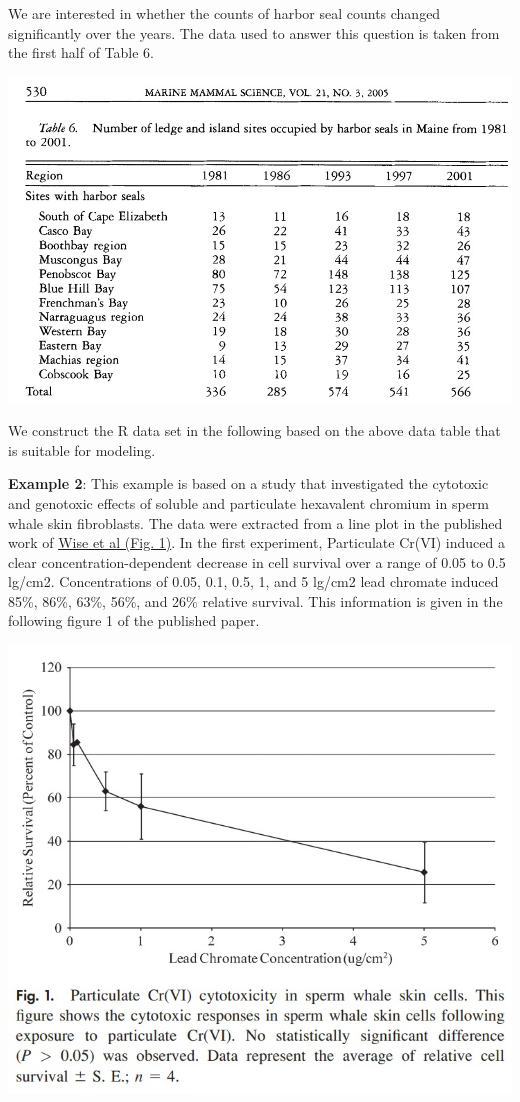 \documentclass[
]{book}
\begin{document}
We are interested in whether the counts of harbor seal counts changed significantly over the years. The data used to answer this question is taken from the first half of Table 6.

\begin{center}\includegraphics[width=0.8\linewidth]{img13/w13-HarborSealDataTable} \end{center}

We construct the R data set in the following based on the above data table that is suitable for modeling.

\textbf{Example 2}: This example is based on a study that investigated the cytotoxic and genotoxic effects of soluble and particulate hexavalent chromium in sperm whale skin fibroblasts. The data were extracted from a line plot in the published work of \href{https://stat501.s3.amazonaws.com/w13-TheGenotoxicityofParticulate+andSolubleChromate.pdf}{Wise et al (Fig. 1)}. In the first experiment, Particulate Cr(VI) induced a clear concentration-dependent decrease in cell survival over a range of 0.05 to 0.5 lg/cm2. Concentrations of 0.05, 0.1, 0.5, 1, and 5 lg/cm2 lead chromate induced 85\%, 86\%, 63\%, 56\%, and 26\% relative survival. This information is given in the following figure 1 of the published paper.

\begin{center}\includegraphics[width=0.8\linewidth]{img13/w13-CytotoxicityDataTable} \end{center}
\end{document}
